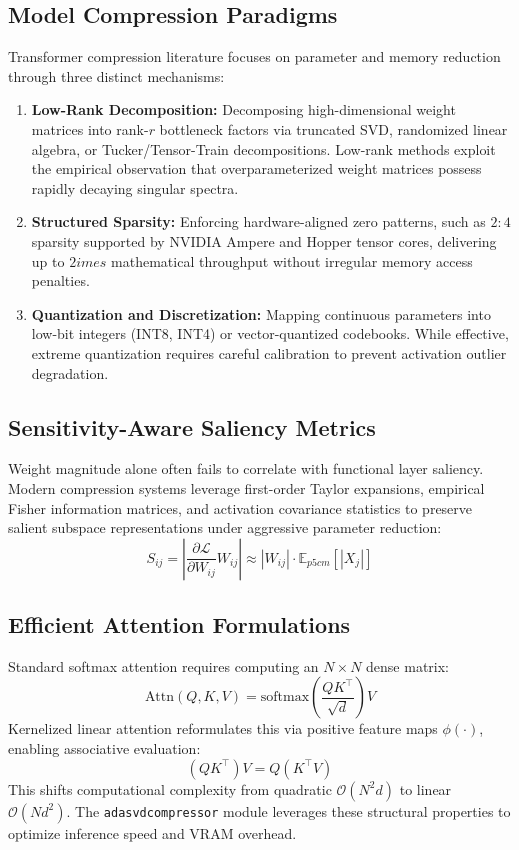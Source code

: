 \documentclass{article}
\begin{document}
\subsection{Model Compression Paradigms}
Transformer compression literature focuses on parameter and memory reduction through three distinct mechanisms:
\begin{enumerate}
\item \textbf{Low-Rank Decomposition:} Decomposing high-dimensional weight matrices into rank-$r$ bottleneck factors via truncated SVD, randomized linear algebra, or Tucker/Tensor-Train decompositions. Low-rank methods exploit the empirical observation that overparameterized weight matrices possess rapidly decaying singular spectra.
\item \textbf{Structured Sparsity:} Enforcing hardware-aligned zero patterns, such as $2:4$ sparsity supported by NVIDIA Ampere and Hopper tensor cores, delivering up to $2	imes$ mathematical throughput without irregular memory access penalties.
\item \textbf{Quantization and Discretization:} Mapping continuous parameters into low-bit integers (INT8, INT4) or vector-quantized codebooks. While effective, extreme quantization requires careful calibration to prevent activation outlier degradation.
\end{enumerate}

\subsection{Sensitivity-Aware Saliency Metrics}
Weight magnitude alone often fails to correlate with functional layer saliency. Modern compression systems leverage first-order Taylor expansions, empirical Fisher information matrices, and activation covariance statistics to preserve salient subspace representations under aggressive parameter reduction:
\[
S_{ij} = \left| \frac{\partial \mathcal{L}}{\partial W_{ij}} W_{ij} \right| \approx |W_{ij}| \cdot \mathbb{E}_{p{5cm}}[|X_j|]
\]

\subsection{Efficient Attention Formulations}
Standard softmax attention requires computing an $N \times N$ dense matrix:
\[
\text{Attn}(Q, K, V) = \text{softmax}\left(\frac{Q K^\top}{\sqrt{d}}\right) V
\]
Kernelized linear attention reformulates this via positive feature maps $\phi(\cdot)$, enabling associative evaluation:
\[
(Q K^\top) V = Q (K^\top V)
\]
This shifts computational complexity from quadratic $\mathcal{O}(N^2 d)$ to linear $\mathcal{O}(N d^2)$. The \texttt{adasvdcompressor} module leverages these structural properties to optimize inference speed and VRAM overhead.
\end{document}
